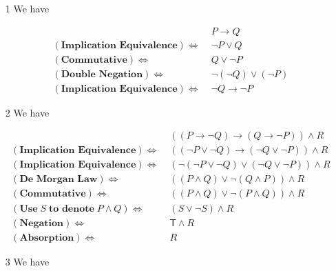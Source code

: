 \documentclass{article}
\begin{document}
\begin{itemize}
    \item[1] We have

    $$
        \begin{aligned}
            &P\to Q\\
            (\textbf{Implication Equivalence}) \Leftrightarrow\;&\lnot P\vee Q\\
            (\textbf{Commutative}) \Leftrightarrow\;&Q\vee\lnot P\\
            (\textbf{Double Negation}) \Leftrightarrow\;&\lnot(\lnot Q)\vee(\lnot P)\\
            (\textbf{Implication Equivalence}) \Leftrightarrow\;&\lnot Q\to\lnot P
        \end{aligned}
    $$

    \item[2] We have

    $$
        \begin{aligned}
            &((P\to \lnot Q)\to(Q\to \lnot P))\wedge R\\
            (\textbf{Implication Equivalence}) \Leftrightarrow\;&((\lnot P\vee\lnot Q)\to(\lnot Q\vee\lnot P))\wedge R\\
            (\textbf{Implication Equivalence}) \Leftrightarrow\;&(\lnot(\lnot P\vee\lnot Q)\vee(\lnot Q\vee\lnot P))\wedge R\\
            (\textbf{De Morgan Law}) \Leftrightarrow\;&((P\wedge Q)\vee \lnot(Q\wedge P))\wedge R\\
            (\textbf{Commutative}) \Leftrightarrow\;&((P\wedge Q)\vee \lnot(P\wedge Q))\wedge R\\
            (\textbf{Use}\;S\;\textbf{to denote}\;P\wedge Q) \Leftrightarrow\;&(S\vee\lnot S)\wedge R\\
            (\textbf{Negation}) \Leftrightarrow\;&\mathsf{T}\wedge R\\
            (\textbf{Absorption}) \Leftrightarrow\;& R
        \end{aligned}
    $$

    \item[3] We have


\end{itemize}
\end{document}

